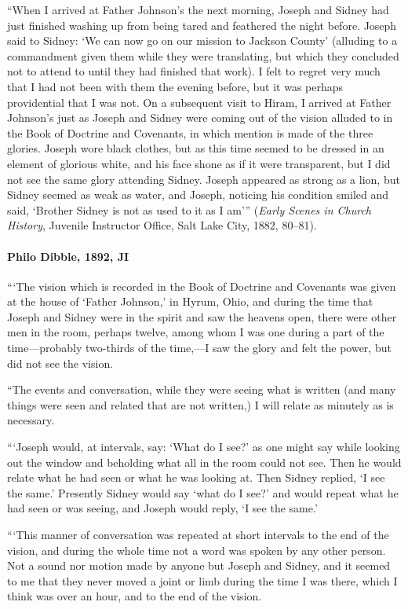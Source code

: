 			``When I arrived at Father Johnson's the next morning, Joseph and Sidney had just finished washing up from being tared and feathered the night before. Joseph said to Sidney: `We can now go on our mission to Jackson County' (alluding to a commandment given them while they were translating, but which they concluded not to attend to until they had finished that work). I felt to regret very much that I had not been with them the evening before, but it was perhaps providential that I was not. On a subsequent visit to Hiram, I arrived at Father Johnson's just as Joseph and Sidney were coming out of the vision alluded to in the Book of Doctrine and Covenants, in which mention is made of the three glories. Joseph wore black clothes, but as this time seemed to be dressed in an element of glorious white, and his face shone as if it were transparent, but I did not see the same glory attending Sidney. Joseph appeared as strong as a lion, but Sidney seemed as weak as water, and Joseph, noticing his condition smiled and said, `Brother Sidney is not as used to it as I am''' (\textit{Early Scenes in Church History}, Juvenile Instructor Office, Salt Lake City, 1882, 80--81).
			
		\paragraph{Philo Dibble, 1892, JI}
		
			```The vision which is recorded in the Book of Doctrine and Covenants was given at the house of `Father Johnson,' in Hyrum, Ohio, and during the time that Joseph and Sidney were in the spirit and saw the heavens open, there were other men in the room, perhaps twelve, among whom I was one during a part of the time---probably two-thirds of the time,---I saw the glory and felt the power, but did not see the vision.
			
			``The events and conversation, while they were seeing what is written (and many things were seen and related that are not written,) I will relate as minutely as is necessary.
			
			```Joseph would, at intervals, say: `What do I see?' as one might say while looking out the window and beholding what all in the room could not see. Then he would relate what he had seen or what he was looking at. Then Sidney replied, `I see the same.' Presently Sidney would say `what do I see?' and would repeat what he had seen or was seeing, and Joseph would reply, `I see the same.'
			
			```This manner of conversation was repeated at short intervals to the end of the vision, and during the whole time not a word was spoken by any other person. Not a sound nor motion made by anyone but Joseph and Sidney, and it seemed to me that they never moved a joint or limb during the time I was there, which I think was over an hour, and to the end of the vision.
			
